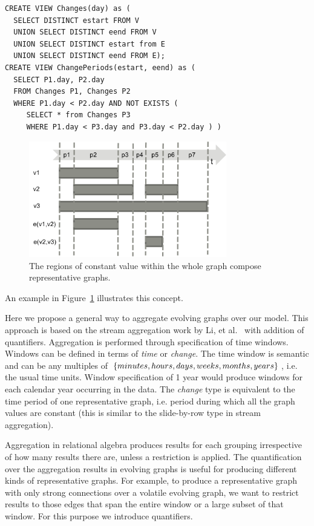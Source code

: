 \begin{small}
\begin{verbatim}
CREATE VIEW Changes(day) as (
  SELECT DISTINCT estart FROM V
  UNION SELECT DISTINCT eend FROM V
  UNION SELECT DISTINCT estart from E
  UNION SELECT DISTINCT eend FROM E);
CREATE VIEW ChangePeriods(estart, eend) as (
  SELECT P1.day, P2.day
  FROM Changes P1, Changes P2
  WHERE P1.day < P2.day AND NOT EXISTS (
     SELECT * from Changes P3
     WHERE P1.day < P3.day and P3.day < P2.day ) )
\end{verbatim}
\end{small}

\begin{figure}
\centering
\includegraphics[width=3.4in]{figs/change_timeline.pdf}
\caption{The regions of constant value within the whole graph compose
  representative graphs.}
\label{fig:changes}
\end{figure}

An example in Figure~\ref{fig:changes} illustrates this concept.

Here we propose a general way to aggregate evolving graphs over our
model.  This approach is based on the stream aggregation work by Li,
et al.~\cite{Li2005} with addition of quantifiers.  Aggregation is
performed through specification of time windows.  Windows can be
defined in terms of {\em time} or {\em change}.  The time window is
semantic and can be any multiples of $\{minutes, hours, days, weeks,
\\ months, years\}$, i.e. the usual time units.  Window specification
of 1 year would produce windows for each calendar year occurring in
the data.  The {\em change} type is equivalent to the time period of
one representative graph, i.e. period during which all the graph
values are constant (this is similar to the slide-by-row type in
stream aggregation).


Aggregation in relational algebra produces results for each grouping
irrespective of how many results there are, unless a 
restriction is applied.  The quantification over the aggregation
results in evolving graphs is useful for producing different kinds of
representative graphs.  For example, to produce a representative graph
with only strong connections over a volatile evolving graph, we want
to restrict results to those edges that span the entire window or a
large subset of that window.  For this purpose we introduce
quantifiers.

